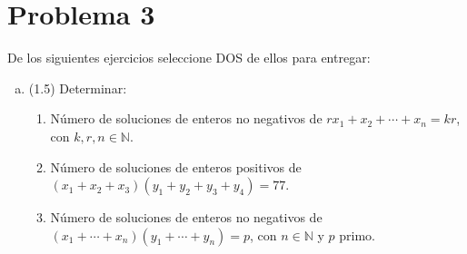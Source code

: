 
\section*{Problema 3}
De los siguientes ejercicios seleccione DOS de ellos para entregar:
\begin{enumerate}[a)]
  \item (1.5) Determinar:
    \begin{enumerate}[1)]
      \item Número de soluciones de enteros no negativos de $r x_1 + x_2 + \cdots + x_n = k r$, con $k,r,n\in\mathbb{N}$.
      \item Número de soluciones de enteros positivos de $(x_1+x_2+x_3)(y_1+y_2+y_3+y_4)=77$.
      \item Número de soluciones de enteros no negativos de $(x_1+\cdots+x_n)(y_1+\cdots+y_n)=p$, con $n\in\mathbb{N}$ y $p$ primo.
    \end{enumerate}
\end{enumerate}

